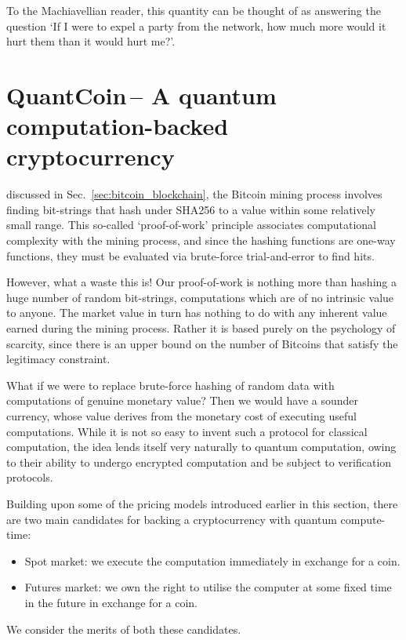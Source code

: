 To the Machiavellian reader, this quantity can be thought of as answering the question `If I were to expel a party from the network, how much more would it hurt them than it would hurt me?'.

%
%

\section{QuantCoin\texttrademark\,-- A quantum computation-backed cryptocurrency}\label{sec:quant_coin_technical}

 discussed in Sec.~\ref{sec:bitcoin_blockchain}, the Bitcoin mining process involves finding bit-strings that hash under SHA256 to a value within some relatively small range. This so-called `proof-of-work' principle associates computational complexity with the mining process, and since the hashing functions are one-way functions, they must be evaluated via brute-force trial-and-error to find hits.

However, what a waste this is! Our proof-of-work is nothing more than hashing a huge number of random bit-strings, computations which are of no intrinsic value to anyone. The market value in turn has nothing to do with any inherent value earned during the mining process. Rather it is based purely on the psychology of scarcity, since there is an upper bound on the number of Bitcoins that satisfy the legitimacy constraint.

What if we were to replace brute-force hashing of random data with computations of genuine monetary value? Then we would have a sounder currency, whose value derives from the monetary cost of executing useful computations. While it is not so easy to invent such a protocol for classical computation, the idea lends itself very naturally to quantum computation, owing to their ability to undergo encrypted computation and be subject to verification protocols.

Building upon some of the pricing models introduced earlier in this section, there are two main candidates for backing a cryptocurrency with quantum compute-time:
\begin{itemize}
	\item Spot market: we execute the computation immediately in exchange for a coin.
	\item Futures market: we own the right to utilise the computer at some fixed time in the future in exchange for a coin.
\end{itemize}
We consider the merits of both these candidates.

